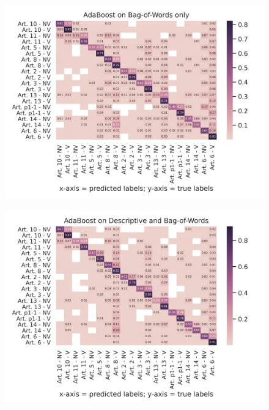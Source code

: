 \documentclass{article}
\begin{document}
~\\\newpage
\begin{figure}[!htb]
    \centering
    \includegraphics[scale=0.7]{data/analysis/cm/multiclass_cm_test_adaboost_bag-of-words_only.png}  
\end{figure}
\begin{figure}[!htb]
    \centering
    \includegraphics[scale=0.7]{data/analysis/cm/multiclass_cm_test_adaboost_descriptive_and_bag-of-words.png}  
\end{figure}
\end{document}
